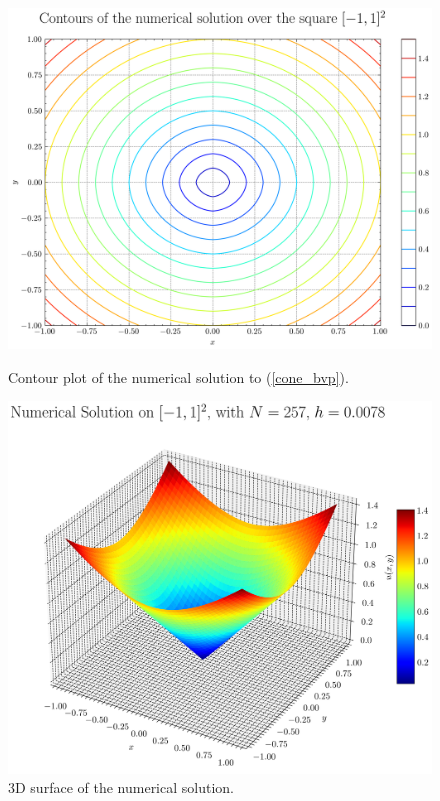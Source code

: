 \documentclass[11pt]{article}
\theoremstyle{definition}
\theoremstyle{remark}
\begin{document}
\begin{figure}[h!]
    \centering
    \begin{minipage}{0.48\linewidth}
        \centering
        \includegraphics[width=\linewidth]{plots/contour_plot_2D_distance.png}
        \caption{Contour plot of the numerical solution to (\ref{cone_bvp}).}
        \label{fig:contour-distance}
    \end{minipage}
    \hfill
    \begin{minipage}{0.48\linewidth}
        \centering
        \includegraphics[width=\linewidth]{plots/solution_3d_surface.png}
        \caption{3D surface of the numerical solution.}
        \label{fig:3d-surface}
    \end{minipage}
\end{figure}
\vspace{20pt}
\end{document}
